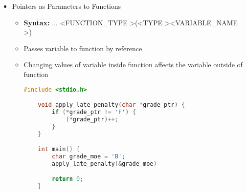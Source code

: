 \documentclass[12pt]{article}
\begin{document}
\bigskip

\begin{itemize}
    \item Pointers as Parameters to Functions
    \begin{itemize}
        \item \textbf{Syntax:} ... \textless FUNCTION\_TYPE \textgreater(\textless TYPE \textgreater *\textless VARIABLE\_NAME \textgreater)
        \item Passes variable to function by reference
        \item Changing values of variable inside function affects the variable
        outside of function

    \begin{lstlisting}[language=c]
    #include <stdio.h>

    void apply_late_penalty(char *grade_ptr) {
        if (*grade_ptr != 'F') {
            (*grade_ptr)++;
        }
    }

    int main() {
        char grade_moe = 'B';
        apply_late_penalty(&grade_moe)

        return 0;
    }
    \end{lstlisting}
    \end{itemize}
\end{itemize}
\end{document}

